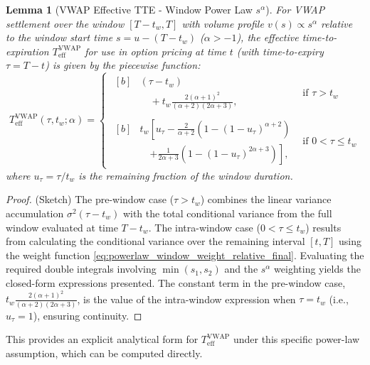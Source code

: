 \documentclass[11pt]{article}
\theoremstyle{plain}
\newtheorem{lemma}{Lemma}[section]
\begin{document}
\begin{lemma}[VWAP Effective TTE - Window Power Law $s^\alpha$] \label{lem:vwap_tte_powerlaw_window_final}
For VWAP settlement over the window $[T-t_w, T]$ with volume profile $v(s) \propto s^\alpha$ relative to the window start time $s=u-(T-t_w)$ ($\alpha > -1$), the effective time-to-expiration $T_{\mathrm{eff}}^{\mathrm{VWAP}}$ for use in option pricing at time $t$ (with time-to-expiry $\tau = T-t$) is given by the piecewise function:
\begin{equation} \label{eq:tte_eff_vwap_piecewise_final}
  T_{\mathrm{eff}}^{\mathrm{VWAP}}(\tau, t_w; \alpha) =
  \begin{cases}
     \begin{aligned}[b]
        &(\tau - t_w) \\
        & \quad + t_w \frac{2(\alpha+1)^2}{(\alpha+2)(2\alpha+3)},
     \end{aligned}
        & \text{if } \tau > t_w \\[3ex]
     \begin{aligned}[b]
        &t_w \left[ u_\tau - \frac{2}{\alpha+2}(1-(1-u_\tau)^{\alpha+2}) \right. \\
        & \quad \left. + \frac{1}{2\alpha+3}(1-(1-u_\tau)^{2\alpha+3}) \right],
     \end{aligned}
        & \text{if } 0 < \tau \le t_w
  \end{cases}
\end{equation}
where $u_\tau = \tau/t_w$ is the remaining fraction of the window duration.
\end{lemma}
\begin{proof} (Sketch)
  The pre-window case ($\tau > t_w$) combines the linear variance accumulation $\sigma^2(\tau-t_w)$ with the total conditional variance from the full window evaluated at time $T-t_w$. The intra-window case ($0 < \tau \le t_w$) results from calculating the conditional variance over the remaining interval $[t, T]$ using the weight function \eqref{eq:powerlaw_window_weight_relative_final}. Evaluating the required double integrals involving $\min(s_1, s_2)$ and the $s^\alpha$ weighting yields the closed-form expressions presented. The constant term in the pre-window case, $t_w \frac{2(\alpha+1)^2}{(\alpha+2)(2\alpha+3)}$, is the value of the intra-window expression when $\tau=t_w$ (i.e., $u_\tau=1$), ensuring continuity.
\end{proof}

This provides an explicit analytical form for $T_{\mathrm{eff}}^{\mathrm{VWAP}}$ under this specific power-law assumption, which can be computed directly.
\end{document}
